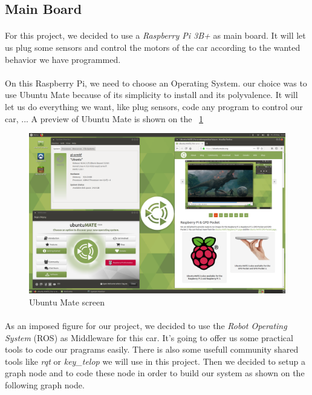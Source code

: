 
\subsection{Main Board}
\paragraph{}For this project, we decided to use a \textit{Raspberry Pi 3B+}
as main board. It will let us plug some sensors and control the motors of
the car according to the wanted behavior we have programmed.

\paragraph{}On this Raspberry Pi, we need to choose an Operating System. our
choice was to use Ubuntu Mate because of its simplicity to install and its 
polyvalence. It will let us do everything we want, like plug sensors, code
any program to control our car, ... A preview of Ubuntu Mate is shown on
the ~\ref{fig:ubuntu}

\begin{figure}[!ht]
    \begin{center}
        \includegraphics[scale=0.3]{Images/Ubuntu_mate.png}
    \end{center}
    \caption{Ubuntu Mate screen}
    \label{fig:ubuntu}
\end{figure}

\paragraph{}As an imposed figure for our project, we decided to use the 
\textit{Robot Operating System} (ROS) as Middleware for this car. It's
going to offer us some practical tools to code our pragrams easily.
There is also some usefull community shared tools like \textit{rqt}
or \textit{key\_telop} we will use in this project. Then we decided to
setup a graph node and to code these node in order to build our system
as shown on the following graph node.

